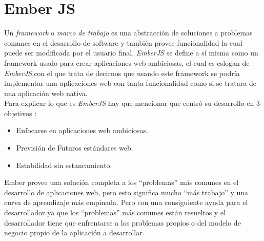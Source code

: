 \section{Ember JS}
\label{sec:ember_js}


Un \emph{framework} o \emph{marco de trabajo} es una abstracción de soluciones a problemas comunes en el desarrollo de software y también provee funcionalidad la cual puede ser modificada por el usuario final, \emph{EmberJS} se define a sí misma como un framework usado para crear aplicaciones web ambiciosas, el cual es eslogan de \emph{EmberJS},con el que trata de decirnos que usando este framework se podría implementar una aplicaciones web con tanta funcionalidad como si se tratara de una aplicación web nativa.\\

Para explicar lo que es \emph{EmberJS} hay que mencionar que centró su desarrollo en 3 objetivos \cite{ember_antidote}:

\begin{itemize}
  \item Enfocarse en aplicaciones web ambiciosas. %
  \item Previsión de Futuros estándares web. %
  \item Estabilidad sin estancamiento. %
\end{itemize}

Ember provee una solución completa a los ``problemas'' más comunes en el desarrollo de aplicaciones web, pero esto significa mucho ``más trabajo'' y una curva de aprendizaje más empinada. Pero con una consiguiente ayuda para el desarrollador ya que los ``problemas'' más comunes están resueltos y el desarrollador tiene que enfrentarse a los problemas propios o del modelo de negocio propio de la aplicación a desarrollar.\\

